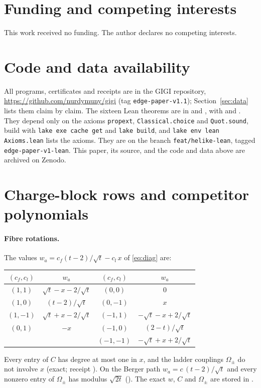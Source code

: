 \documentclass[11pt]{article}
\theoremstyle{definition}
\theoremstyle{remark}
\begin{document}
\section*{Funding and competing interests}
This work received no funding. The author declares no competing interests.

\section*{Code and data availability}\label{sec:availability}
All programs, certificates and receipts are in the \textsc{GIGI} repository, \url{https://github.com/nurdymuny/gigi}
(tag \texttt{edge-paper-v1.1}); Section~\ref{sec:data} lists them claim by claim. The sixteen Lean theorems are in
 and , with  and .
They depend only on the axioms \texttt{propext}, \texttt{Classical.choice} and \texttt{Quot.sound}, build with
\texttt{lake exe cache get} and \texttt{lake build}, and \texttt{lake env lean Axioms.lean} lists the axioms. They are on the branch \texttt{feat/helike-lean},
tagged \texttt{edge-paper-v1-lean}. This paper,
its source, and the code and data above are archived on Zenodo.

\appendix

\section{Charge-block rows and competitor polynomials}\label{app:rows}

\paragraph{Fibre rotations.} The values $w_a=c_f(t-2)/\sqrt t-c_l\,x$ of \eqref{eq:diag} are:
\begin{center}
\begin{tabular}{@{}cccc@{}}
\toprule
$(c_f,c_l)$ & $w_a$ & $(c_f,c_l)$ & $w_a$\\
\midrule
$(1,1)$ & $\sqrt t-x-2/\sqrt t$ & $(0,0)$ & $0$\\
$(1,0)$ & $(t-2)/\sqrt t$ & $(0,-1)$ & $x$\\
$(1,-1)$ & $\sqrt t+x-2/\sqrt t$ & $(-1,1)$ & $-\sqrt t-x+2/\sqrt t$\\
$(0,1)$ & $-x$ & $(-1,0)$ & $(2-t)/\sqrt t$\\
 & & $(-1,-1)$ & $-\sqrt t+x+2/\sqrt t$\\
\bottomrule
\end{tabular}
\end{center}
Every entry of $C$ has degree at most one in $x$, and the ladder couplings $\Omega_\pm$ do not involve $x$ (exact;
receipt ). On the Berger path $w_a=c\,(t-2)/\sqrt t$ and every nonzero entry of $\Omega_\pm$
has modulus $\sqrt{2t}$ (). The exact $w$, $C$ and $\Omega_\pm$ are stored in
.
\end{document}
